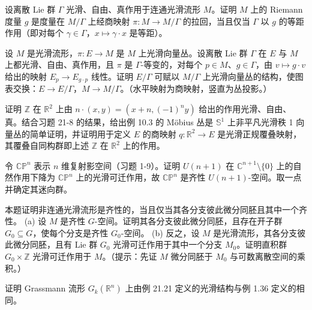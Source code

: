 \documentclass[../../main.tex]{subfiles}
\begin{document}
\begin{exercise}\label{exercise:ch21-7}
设离散 Lie 群 $\Gamma$ 光滑、自由、真作用于连通光滑流形 $M$。证明 $M$ 上的 Riemann 度量 $g$ 是度量在 $M/\Gamma$ 上经商映射 $\pi\colon M\to M/\Gamma$ 的拉回，当且仅当 $\Gamma$ 以 $g$ 的等距作用（即对每个 $\gamma\in\Gamma$，$x\mapsto\gamma\cdot x$ 是等距）。
\end{exercise}

\begin{exercise}\label{exercise:ch21-8}
设 $M$ 是光滑流形，$\pi\colon E\to M$ 是 $M$ 上光滑向量丛。设离散 Lie 群 $\Gamma$ 在 $E$ 与 $M$ 上都光滑、自由、真作用，且 $\pi$ 是 $\Gamma$-等变的，对每个 $p\in M$、$g\in\Gamma$，由 $v\mapsto g\cdot v$ 给出的映射 $E_p\to E_{g\cdot p}$ 线性。证明 $E/\Gamma$ 可赋以 $M/\Gamma$ 上光滑向量丛的结构，使图表交换：$E\to E/\Gamma$，$M\to M/\Gamma$。（水平映射为商映射，竖直为丛投影。）
\end{exercise}

\begin{exercise}\label{exercise:ch21-9}
证明 $\mathbb{Z}$ 在 $\mathbb{R}^2$ 上由 $n\cdot(x,y)=(x+n,(-1)^n y)$ 给出的作用光滑、自由、真。结合习题 21-8 的结果，给出例 10.3 的 Möbius 丛是 $\mathbb{S}^1$ 上非平凡光滑秩 1 向量丛的简单证明，并证明用于定义 $E$ 的商映射 $q\colon\mathbb{R}^2\to E$ 是光滑正规覆叠映射，其覆叠自同构群即上述 $\mathbb{Z}$ 在 $\mathbb{R}^2$ 上的作用。
\end{exercise}

\begin{exercise}\label{exercise:ch21-10}
令 $\mathbb{CP}^n$ 表示 $n$ 维复射影空间（习题 1-9）。证明 $U(n+1)$ 在 $\mathbb{C}^{n+1}\setminus\{0\}$ 上的自然作用下降为 $\mathbb{CP}^n$ 上的光滑可迁作用，故 $\mathbb{CP}^n$ 是齐性 $U(n+1)$-空间。取一点并确定其迷向群。
\end{exercise}

\begin{exercise}\label{exercise:ch21-11}
本题证明非连通光滑流形是齐性的，当且仅当其各分支彼此微分同胚且其中一个齐性。
(a) 设 $M$ 是齐性 $G$-空间。证明其各分支彼此微分同胚，且存在开子群 $G_0\subseteq G$，使每个分支是齐性 $G_0$-空间。
(b) 反之，设 $M$ 是光滑流形，其各分支彼此微分同胚，且有 Lie 群 $G_0$ 光滑可迁作用于其中一个分支 $M_0$。证明直积群 $G_0\times\mathbb{Z}$ 光滑可迁作用于 $M$。（提示：先证 $M$ 微分同胚于 $M_0$ 与可数离散空间的乘积。）
\end{exercise}

\begin{exercise}\label{exercise:ch21-12}
证明 Grassmann 流形 $G_k(\mathbb{R}^n)$ 上由例 21.21 定义的光滑结构与例 1.36 定义的相同。
\end{exercise}
\end{document}
